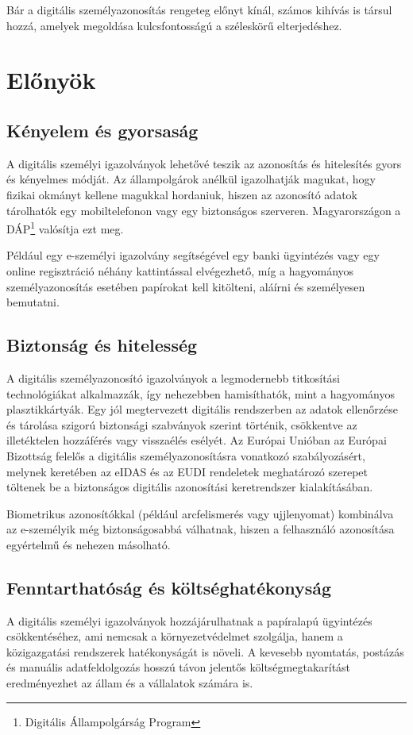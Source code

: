 \documentclass[
]{thesis-ekf}
\theoremstyle{definition}
\theoremstyle{remark}
\begin{document}
	Bár a digitális személyazonosítás rengeteg előnyt kínál, számos kihívás is társul hozzá, amelyek megoldása kulcsfontosságú a széleskörű elterjedéshez.
	\section{Előnyök}
	\subsection{Kényelem és gyorsaság}
	A digitális személyi igazolványok lehetővé teszik az azonosítás és hitelesítés gyors és kényelmes módját. Az állampolgárok anélkül igazolhatják magukat, hogy fizikai okmányt kellene magukkal hordaniuk, hiszen az azonosító adatok tárolhatók egy mobiltelefonon vagy egy biztonságos szerveren. Magyarországon a DÁP\footnote{Digitális Állampolgárság Program} valósítja ezt meg.
	
	Például egy e-személyi igazolvány segítségével egy banki ügyintézés vagy egy online regisztráció néhány kattintással elvégezhető, míg a hagyományos személyazonosítás esetében papírokat kell kitölteni, aláírni és személyesen bemutatni.
	\subsection{Biztonság és hitelesség}
	A digitális személyazonosító igazolványok a legmodernebb titkosítási technológiákat alkalmazzák, így nehezebben hamisíthatók, mint a hagyományos plasztikkártyák. Egy jól megtervezett digitális rendszerben az adatok ellenőrzése és tárolása szigorú biztonsági szabványok szerint történik, csökkentve az illetéktelen hozzáférés vagy visszaélés esélyét. Az Európai Unióban az Európai Bizottság felelős a digitális személyazonosításra vonatkozó szabályozásért, melynek keretében az eIDAS és az EUDI rendeletek meghatározó szerepet töltenek be a biztonságos digitális azonosítási keretrendszer kialakításában. \cite{eIDAS, EUDI}
	
	Biometrikus azonosítókkal (például arcfelismerés vagy ujjlenyomat) kombinálva az e-személyik még biztonságosabbá válhatnak, hiszen a felhasználó azonosítása egyértelmű és nehezen másolható.
	\subsection{Fenntarthatóság és költséghatékonyság}
	A digitális személyi igazolványok hozzájárulhatnak a papíralapú ügyintézés csökkentéséhez, ami nemcsak a környezetvédelmet szolgálja, hanem a közigazgatási rendszerek hatékonyságát is növeli. A kevesebb nyomtatás, postázás és manuális adatfeldolgozás hosszú távon jelentős költségmegtakarítást eredményezhet az állam és a vállalatok számára is.
\end{document}
